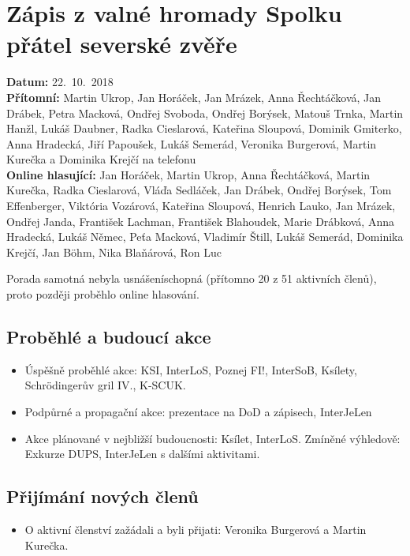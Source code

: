 \documentclass[11pt,a4paper]{article}
\begin{document}
\section*{Zápis z valné hromady Spolku přátel severské zvěře}
\textbf{Datum:} 22.~10.~2018\\
\textbf{Přítomní:} Martin Ukrop, Jan Horáček, Jan Mrázek, Anna Řechtáčková, Jan Drábek, Petra Macková, Ondřej Svoboda, Ondřej Borýsek, Matouš Trnka, Martin Hanžl, Lukáš Daubner, Radka Cieslarová, Kateřina Sloupová, Dominik Gmiterko, Anna Hradecká, Jiří Papoušek, Lukáš Semerád, Veronika Burgerová, Martin Kurečka a Dominika Krejčí na telefonu\\
\textbf{Online hlasující:} Jan Horáček, Martin Ukrop, Anna Řechtáčková, Martin Kurečka, Radka Cieslarová, Vláďa Sedláček, Jan Drábek, Ondřej Borýsek, Tom Effenberger, Viktória Vozárová, Kateřina Sloupová, Henrich Lauko, Jan Mrázek, Ondřej Janda, František Lachman, František Blahoudek, Marie Drábková, Anna Hradecká, Lukáš Němec, Peťa Macková, Vladimír Štill, Lukáš Semerád, Dominika Krejčí, Jan Böhm, Nika Blaňárová, Ron Luc

\vspace{1em}

\noindent Porada samotná nebyla usnášeníschopná (přítomno 20 z 51 aktivních členů), proto později proběhlo online hlasování.

\subsection*{Proběhlé a budoucí akce}
\begin{itemize}[itemsep=0pt]
\item Úspěšně proběhlé akce: KSI, InterLoS, Poznej FI!, InterSoB, Ksílety, Schrödingerův gril IV., K-SCUK.
\item Podpůrné a propagační akce: prezentace na DoD a zápisech, InterJeLen
\item Akce plánované v nejbližší budoucnosti: Ksílet, InterLoS. Zmíněné výhledově: Exkurze DUPS, InterJeLen s dalšími aktivitami.
\end{itemize}

\subsection*{Přijímání nových členů}
\begin{itemize}[itemsep=0pt]
\item O aktivní členství zažádali a byli přijati: Veronika Burgerová a Martin Kurečka.
\end{itemize}
\end{document}
